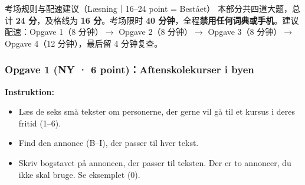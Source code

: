 

\begin{tipbox}{考场规则与配速建议（Læsning｜16--24 point = Bestået）}
\small
本部分共四道大题，总计 \textbf{24 分}，及格线为 \textbf{16 分}。考场限时 \textbf{40 分钟}，全程\textbf{禁用任何词典或手机}。建议配速：Opgave 1（8 分钟）$\rightarrow$ Opgave 2（8 分钟）$\rightarrow$ Opgave 3（8 分钟）$\rightarrow$ Opgave 4（12 分钟），最后留 4 分钟复查。
\end{tipbox}

\subsubsection*{Opgave 1 (NY · 6 point)：Aftenskolekurser i byen}

\textbf{Instruktion:}
\begin{itemize}
  \item Læs de seks små tekster om personerne, der gerne vil gå til et kursus i deres fritid (1--6).
  \item Find den annonce (B--I), der passer til hver tekst.
  \item Skriv bogstavet på annoncen, der passer til teksten. Der er to annoncer, du ikke skal bruge. Se eksemplet (0).
\end{itemize}

